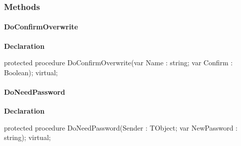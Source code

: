 \documentclass{report}
\newif\ifpdf
\begin{document}
\subsubsection*{\large{\textbf{Methods}}\normalsize\hspace{1ex}\hfill}
\paragraph*{DoConfirmOverwrite}\hspace*{\fill}

\label{AbUnzper.TAbCustomUnZipper-DoConfirmOverwrite}
\begin{list}{}{
\setlength{\itemindent}{0cm}
\setlength{\listparindent}{0cm}
\setlength{\leftmargin}{\evensidemargin}
\addtolength{\leftmargin}{\tmplength}
\settowidth{\labelsep}{X}
\addtolength{\leftmargin}{\labelsep}
\setlength{\labelwidth}{\tmplength}
}
\item[\textbf{Declaration}\hfill]
\ifpdf
\begin{flushleft}
\fi
\begin{ttfamily}
protected procedure DoConfirmOverwrite(var Name : string; var Confirm : Boolean); virtual;\end{ttfamily}

\ifpdf
\end{flushleft}
\fi

\end{list}
\paragraph*{DoNeedPassword}\hspace*{\fill}

\label{AbUnzper.TAbCustomUnZipper-DoNeedPassword}
\begin{list}{}{
\setlength{\itemindent}{0cm}
\setlength{\listparindent}{0cm}
\setlength{\leftmargin}{\evensidemargin}
\addtolength{\leftmargin}{\tmplength}
\settowidth{\labelsep}{X}
\addtolength{\leftmargin}{\labelsep}
\setlength{\labelwidth}{\tmplength}
}
\item[\textbf{Declaration}\hfill]
\ifpdf
\begin{flushleft}
\fi
\begin{ttfamily}
protected procedure DoNeedPassword(Sender : TObject; var NewPassword : string); virtual;\end{ttfamily}

\ifpdf
\end{flushleft}
\fi

\end{list}
\end{document}
